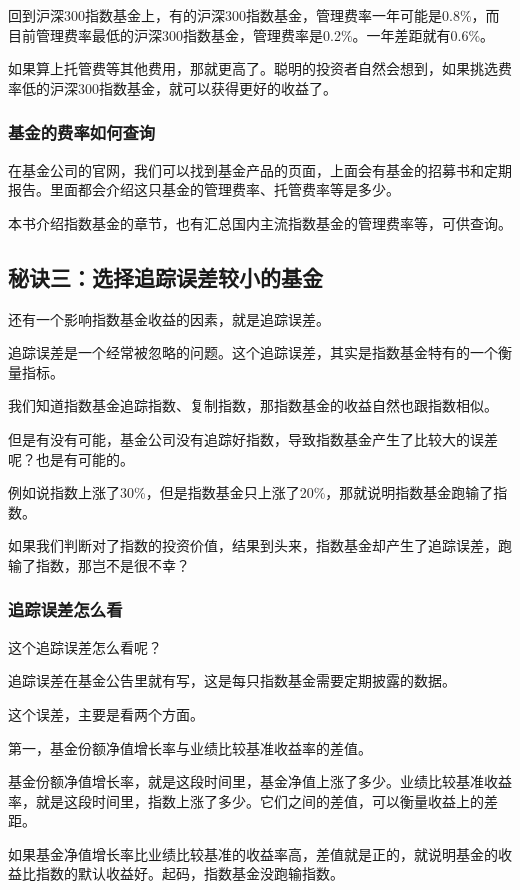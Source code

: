 回到沪深300指数基金上，有的沪深300指数基金，管理费率一年可能是0.8\%，而目前管理费率最低的沪深300指数基金，管理费率是0.2\%。一年差距就有0.6\%。

如果算上托管费等其他费用，那就更高了。聪明的投资者自然会想到，如果挑选费率低的沪深300指数基金，就可以获得更好的收益了。

\subsubsection{基金的费率如何查询}

在基金公司的官网，我们可以找到基金产品的页面，上面会有基金的招募书和定期报告。里面都会介绍这只基金的管理费率、托管费率等是多少。

本书介绍指数基金的章节，也有汇总国内主流指数基金的管理费率等，可供查询。

\subsection{秘诀三：选择追踪误差较小的基金}
还有一个影响指数基金收益的因素，就是追踪误差。

追踪误差是一个经常被忽略的问题。这个追踪误差，其实是指数基金特有的一个衡量指标。

我们知道指数基金追踪指数、复制指数，那指数基金的收益自然也跟指数相似。

但是有没有可能，基金公司没有追踪好指数，导致指数基金产生了比较大的误差呢？也是有可能的。

例如说指数上涨了30\%，但是指数基金只上涨了20\%，那就说明指数基金跑输了指数。

如果我们判断对了指数的投资价值，结果到头来，指数基金却产生了追踪误差，跑输了指数，那岂不是很不幸？

\subsubsection{追踪误差怎么看}

这个追踪误差怎么看呢？

追踪误差在基金公告里就有写，这是每只指数基金需要定期披露的数据。

这个误差，主要是看两个方面。

第一，基金份额净值增长率与业绩比较基准收益率的差值。

基金份额净值增长率，就是这段时间里，基金净值上涨了多少。业绩比较基准收益率，就是这段时间里，指数上涨了多少。它们之间的差值，可以衡量收益上的差距。

如果基金净值增长率比业绩比较基准的收益率高，差值就是正的，就说明基金的收益比指数的默认收益好。起码，指数基金没跑输指数。

